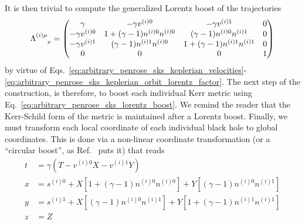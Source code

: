 %
It is then trivial to compute the generalized Lorentz boost of the trajectories
%
\begin{equation}
  \tens{\Lambda}{(i) \mu}{\nu} =
  \begin{pmatrix}
    \gamma            & -\gamma v^{(i) 0}              & -\gamma v^{(i) 1}              & 0 \\
    -\gamma v^{(i) 0} & 1+(\gamma-1) n^{(i)0} n^{(i)0} & (\gamma-1) n^{(i)0} n^{(i)1}   & 0 \\
    -\gamma v^{(i) 1} & (\gamma-1)n^{(i)1} n^{(i)0}    & 1+(\gamma-1) n^{(i)1} n^{(i)1} & 0 \\
    0                 & 0                              & 0                              & 1
  \end{pmatrix}
  \label{eq:arbitrary_penrose_sks_lorentz_boost}
\end{equation}
%
by virtue of Eqs.~\eqref{eq:arbitrary_penrose_sks_keplerian_velocities}-\eqref{eq:arbitrary_penrose_sks_keplerian_orbit_lorentz_factor}. The next step of the construction, is therefore, to boost each individual Kerr metric using Eq.~\eqref{eq:arbitrary_penrose_sks_lorentz_boost}. We remind the reader that the Kerr-Schild form of the metric is maintained after a Lorentz boost. Finally, we must transform each local coordinate of each individual black hole to global coordinates. This is done via a non-linear coordinate transformation (or a ``circular boost'', as Ref.~\cite{Armengol:2021shd} puts it) that reads
%
\begin{align}
  t & = \gamma \left( T - v^{(i) 0} X - v^{(i) 1} Y \right) \label{eq:arbitrary_penrose_sks_nonlinear_transformation_1}                                                                                          \\
  x & = s^{(i) 0} + X \left[ 1 + \left( \gamma - 1 \right) n^{(i) 0} n^{(i) 0}\right] + Y \left[\left( \gamma - 1 \right) n^{(i) 0} n^{(i) 1}\right] \label{eq:arbitrary_penrose_sks_nonlinear_transformation_2} \\
  y & = s^{(i) 1} + X \left[\left( \gamma - 1 \right) n^{(i) 0} n^{(i) 1}\right] + Y \left[1 + \left( \gamma - 1 \right) n^{(i) 1} n^{(i) 1}\right]  \label{eq:arbitrary_penrose_sks_nonlinear_transformation_3} \\
  z & = Z \label{eq:arbitrary_penrose_sks_nonlinear_transformation_4}
\end{align}

